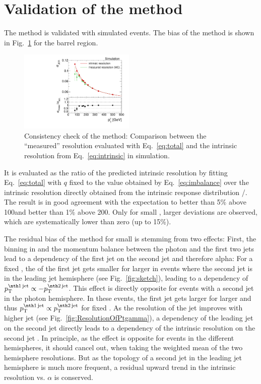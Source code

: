 \section{Validation of the method}
\label{res:sec:validation}
The method is validated with simulated events. 
The bias of the method is shown in Fig.~\ref{fig:MCClosure} for the barrel region. 
\begin{figure}[b]
  \centering
    \includegraphics[width=0.49\textwidth]{figures/resolution/methodology/MCClosure_for_1_eta_bin_RMS99.pdf}
  \caption{Consistency check of the method: Comparison between the ``measured'' resolution evaluated with Eq.~\eqref{eq:total} and the intrinsic resolution from Eq.~\eqref{eq:intrinsic} in simulation.}  
  \label{fig:MCClosure}
\end{figure}
It is evaluated as the ratio of the predicted intrinsic resolution by fitting Eq.~\eqref{eq:total} with $q$ fixed to the value obtained by Eq.~\eqref{eq:imbalance} over the intrinsic resolution directly obtained from the intrinsic response distribution \ptrecojet/\ptgenjet.
The result is in good agreement with the expectation to better than 5\% above 100\gev and better than 1\% above 200\gev.
Only for small \pt, larger deviations are observed, which are systematically lower than zero (up to 15\%).

The residual bias of the method for small \ptgamma is stemming from two effects: 
First, the binning in \ptgamma and the momentum balance between the photon and the first two jets lead to a dependency of the first jet \pt on the second jet \pt and therefore alpha: 
For a fixed \ptgamma, the \pt of the first jet gets smaller for larger \ptsecondjet in events where the second jet is in the leading jet hemisphere (see Fig.~\ref{fig:sketch}), 
leading to a dependency of $\ptfirstjet \propto -\ptsecondjet$.
This effect is directly opposite for events with a second jet in the photon hemisphere. 
In these events, the first jet \pt gets larger for larger \ptsecondjet and thus $\ptfirstjet \propto \ptsecondjet$ for fixed \ptgamma. 
As the resolution of the jet improves with higher jet \pt (see Fig.~\ref{fig:ResolutionOfPtgamma}), a dependency of the leading jet \pt on the second jet \pt directly leads to a dependency of the intrinsic resolution on the second jet \pt. 
In principle, as the effect is opposite for events in the different hemispheres, it should cancel out, when taking the weighted mean of the two hemisphere resolutions. 
But as the topology of a second jet in the leading jet hemisphere is much more frequent, a residual upward trend in the intrinsic resolution vs. $\alpha$ is conserved. 


